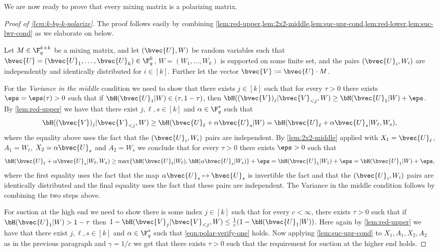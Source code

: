 \documentclass[11pt]{article}
\begin{document}
We are now ready to prove that every mixing matrix is a polarizing matrix.
\begin{proof}[Proof of \cref{lem:k-by-k-polarize}]
	The proof follows easily by combining \cref{lem:red-upper,lem:2x2-middle,lem:suc-upr-cond,lem:red-lower,lem:suc-lwr-cond} as we elaborate on below.
	
	Let $M \in \F_q^{k\times k}$ be a mixing matrix, and let $(\bvec{U}, W)$ be random variables such that  $\bvec{U} = (\bvec{U}_1,\dots,\bvec{U}_k) \in \F_q^k$, $W = (W_1,\ldots,W_k)$ is supported on some finite set, and the pairs  $(\bvec{U}_i,W_i)$ are independently and identically distributed for $i \in [k]$. Further let the vector $\bvec{V} := \bvec{U} \cdot M$. 
	
	For the {\em Variance in the middle} condition we need to show that there exists $j \in [k]$ such that for every $\tau >0$ there exists $\eps=\eps(\tau) > 0$ such that
	if $\bH(\bvec{U}_1 | W) \in (\tau, 1-\tau)$, then
	$\bH((\bvec{V})_j | \bvec{V}_{< j}, W)  \geq \bH(\bvec{U}_1 | W) + \eps$. By \cref{lem:red-upper} we have that there exist $j,\ell,s\in[k]$ and $\alpha \in \F_q^*$ such that \begin{equation}\label{eqn:polar-verify-one}
	\bH((\bvec{V})_j | \bvec{V}_{< j}, W)  \geq \bH(\bvec{U}_\ell + \alpha\bvec{U}_s | W) =\bH(\bvec{U}_\ell + \alpha\bvec{U}_s | W_\ell,W_s),
	\end{equation}
	where the equality above uses the fact that the $(\bvec{U}_i,W_i)$ pairs are independent.
	By \cref{lem:2x2-middle} applied with $X_1 = \bvec{U}_\ell$, $A_1 = W_\ell$, $X_2 = \alpha \bvec{U}_s$ and $A_2 = W_s$ we conclude that for every $\tau >0$ there exists $\eps>0$ such that 
	$$\bH(\bvec{U}_\ell + \alpha\bvec{U}_s | W_\ell,W_s) \geq \max\{\bH(\bvec{U}_\ell|W_\ell),\bH(\alpha\bvec{U}_s|W_s)\}+\eps =  \bH(\bvec{U}_1|W_1)+\eps = \bH(\bvec{U}_1|W)+\eps,$$
	where the first equality uses the fact that the map $\alpha\bvec{U}_s\mapsto\bvec{U}_s$ is invertible  the fact and that the $(\bvec{U}_i,W_i)$ pairs are identically distributed and the final equality uses the fact that these pairs are independent. 
	The Variance in the middle condition follows by combining the two steps above.
	
	For suction at the high end we need to show there is some index $j \in [k]$ such that for every $c < \infty$, there  exists $\tau > 0$ such that if
	$\bH(\bvec{U}_1 | W) > 1- \tau$ then $1 - \bH(\bvec{V}_j | \bvec{V}_{< j}, W)  \leq \frac{1}{c}(1-\bH(\bvec{U}_1 | W))$. Here again by \cref{lem:red-upper} we have that there exist $j,\ell,s\in[k]$ and $\alpha \in \F_q^*$ such that \cref{eqn:polar-verify-one} holds. Now applying \cref{lem:suc-upr-cond} to $X_1,A_1,X_2,A_2$ as in the previous paragraph and $\gamma = 1/c$ we get that there exists $\tau > 0$ such that the requirement for suction at the higher end holds.


\end{proof}
\end{document}
